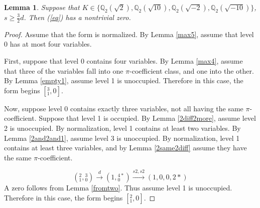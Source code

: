\documentclass[12pt]{amsart}
\newtheorem{lemma}{Lemma}
\begin{document}
\begin{lemma} \label{max3}
Suppose that $K \in \{\mathbb{Q}_2(\sqrt{2}), \mathbb{Q}_2(\sqrt{10}), \mathbb{Q}_2(\sqrt{-2}), \mathbb{Q}_2(\sqrt{-10})\}$, $s \ge \frac{3}{2}d$.  Then (\ref{eq}) has a nontrivial zero.
\end{lemma}
\begin{proof}
Assume that the form is normalized.  By Lemma \ref{max5}, assume that level 0 has at most four variables.  


First, suppose that level 0 contains four variables.  By Lemma \ref{max4}, assume that three of the variables fall into one $\pi$-coefficient class, and one into the other.  By Lemma \ref{empty1}, assume level 1 is unoccupied.  Therefore in this case, the form begins $[{}^{3}_{1},0]$.



Now, suppose level 0 contains exactly three variables, not all having the same $\pi$-coefficient.  Suppose that level 1 is occupied.  By Lemma \ref{2diff2more}, assume level 2 is unoccupied.  By normalization, level 1 contains at least two variables.  By Lemma \ref{2and2and1}, assume level 3 is unoccupied.  By normalization, level 1 contains at least three variables, and by Lemma \ref{2same2diff} assume they have the same $\pi$-coefficient.

$$({}^{2}_{1}, {}^{3}_{0}) \xrightarrow{d} (1, {}^{4*}_{0}) \xrightarrow{s2, s2} (1, 0, 0, 2*)$$
A zero follows from Lemma \ref{fromtwo}.  Thus assume level 1 is unoccupied.  Therefore in this case, the form begins $[{}^2_1,0]$.


\end{proof}
\end{document}
